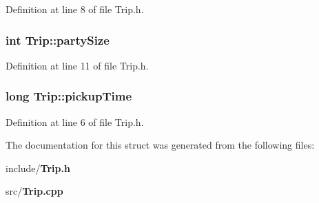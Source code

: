 Definition at line 8 of file Trip.\+h.

\subsubsection[{party\+Size}]{\setlength{\rightskip}{0pt plus 5cm}int Trip\+::party\+Size}\label{struct_trip_aa8fbdf14714f874eeab3b8b56681840a}


Definition at line 11 of file Trip.\+h.

\subsubsection[{pickup\+Time}]{\setlength{\rightskip}{0pt plus 5cm}long Trip\+::pickup\+Time}\label{struct_trip_a9cb92b360488aee5194aa781beac880d}


Definition at line 6 of file Trip.\+h.



The documentation for this struct was generated from the following files\+:\begin{DoxyCompactItemize}
\item 
include/{\bf Trip.\+h}\item 
src/{\bf Trip.\+cpp}\end{DoxyCompactItemize}
